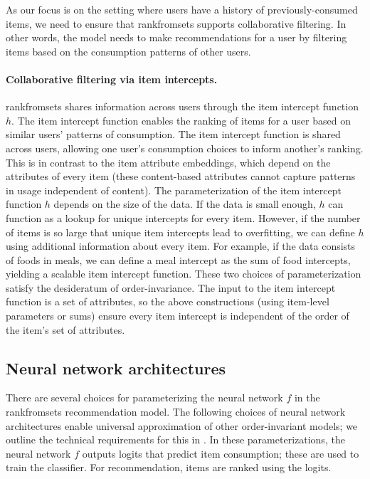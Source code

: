 As our focus is on the setting where users have a history of previously-consumed
items, we need to ensure that \acrshort{rankfromsets} supports collaborative
filtering. In other words, the model needs to make recommendations for a user by
filtering items based on the consumption patterns of other users. 

\paragraph{Collaborative filtering via item intercepts.}
\acrshort{rankfromsets} shares information across users through the item
intercept function $h$. The item intercept function enables the ranking of items
for a user based on similar users' patterns of consumption. The item intercept
function is shared across users, allowing one user's consumption choices to
inform another's ranking. This is in contrast to the item attribute embeddings,
which depend on the attributes of every item (these content-based attributes
cannot capture patterns in usage independent of content). The parameterization
of the item intercept function $h$ depends on the size of the data. If the data
is small enough, $h$ can function as a lookup for unique intercepts for every
item. However, if the number of items is so large that unique item intercepts
lead to overfitting, we can define $h$ using additional information about every
item. For example, if the data consists of foods in meals, we can define a meal
intercept as the sum of food intercepts, yielding a scalable item intercept
function. These two choices of parameterization satisfy the desideratum of
order-invariance. The input to the item intercept function is a set of
attributes, so the above constructions (using item-level parameters or sums)
ensure every item intercept is independent of the order of the item's set of
attributes.

\subsection{Neural network architectures}
\label{sec:parameterizations}
There are several choices for parameterizing the neural network $f$ in the
\acrshort{rankfromsets} recommendation model. The following choices of neural
network architectures enable universal approximation of other order-invariant
models; we outline the technical requirements for this in . In
these parameterizations, the neural network $f$ outputs logits that predict item
consumption; these are used to train the classifier. For recommendation, items
are ranked using the logits.

